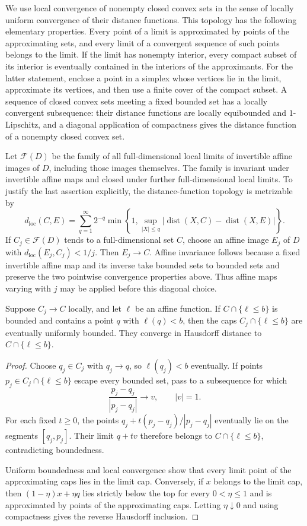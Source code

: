 We use local convergence of nonempty closed convex sets in the sense
of locally uniform convergence of their distance functions.
This topology has the following elementary properties.  Every point
of a limit is approximated by points of the approximating sets, and
every limit of a convergent sequence of such points belongs to the
limit.  If the limit has nonempty interior, every compact subset of
its interior is eventually contained in the interiors of the
approximants.  For the latter statement, enclose a point in a simplex
whose vertices lie in the limit, approximate its vertices, and then
use a finite cover of the compact subset.  A sequence of closed convex
sets meeting a fixed bounded set has a locally convergent subsequence:
their distance functions are locally equibounded and $1$-Lipschitz,
and a diagonal application of compactness gives the distance function
of a nonempty closed convex set.

Let $\mathcal F(D)$ be the family of all full-dimensional local
limits of invertible affine images of $D$, including those images
themselves.  The family is invariant under invertible affine maps
and closed under further full-dimensional local limits.  To justify
the last assertion explicitly, the distance-function topology is
metrizable by
\[
 d_{\mathrm{loc}}(C,E)=
 \sum_{q=1}^{\infty}2^{-q}
 \min\left\{1,\sup_{|X|\le q}
       |\operatorname{dist}(X,C)-\operatorname{dist}(X,E)|\right\}.
\]
If $C_j\in\mathcal F(D)$ tends to a full-dimensional set $C$, choose
an affine image $E_j$ of $D$ with
$d_{\mathrm{loc}}(E_j,C_j)<1/j$.  Then $E_j\to C$.
Affine invariance follows because a fixed invertible affine map and
its inverse take bounded sets to bounded sets and preserve the two
pointwise convergence properties above.  Thus affine maps varying
with $j$ may be applied before this diagonal choice.

\begin{lemma}\label{lem:cap-compactness}
Suppose $C_j\to C$ locally, and let $\ell$ be an affine function.
If $C\cap\{\ell\le b\}$ is bounded and contains a point $q$ with
$\ell(q)<b$, then the caps $C_j\cap\{\ell\le b\}$ are eventually
uniformly bounded.  They converge in Hausdorff distance to
$C\cap\{\ell\le b\}$.
\end{lemma}

\begin{proof}
Choose $q_j\in C_j$ with $q_j\to q$, so $\ell(q_j)<b$ eventually.
If points $p_j\in C_j\cap\{\ell\le b\}$ escape every bounded set,
pass to a subsequence for which
\[
 \frac{p_j-q_j}{|p_j-q_j|}\longrightarrow v,\qquad |v|=1.
\]
For each fixed $t\ge0$, the points
$q_j+t(p_j-q_j)/|p_j-q_j|$ eventually lie on the segments
$[q_j,p_j]$.  Their limit $q+tv$ therefore belongs to
$C\cap\{\ell\le b\}$, contradicting boundedness.

Uniform boundedness and local convergence show that every limit
point of the approximating caps lies in the limit cap.  Conversely,
if $x$ belongs to the limit cap, then
$(1-\eta)x+\eta q$ lies strictly below the top for every
$0<\eta\le1$ and is approximated by points of the approximating
caps.  Letting $\eta\downarrow0$ and using compactness gives the
reverse Hausdorff inclusion.
\end{proof}


